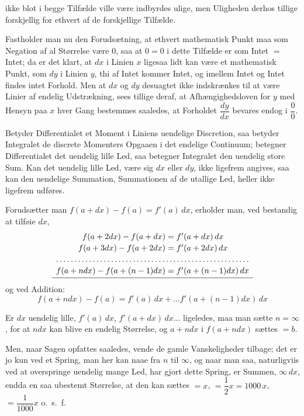 \documentclass[12pt]{book}
\newcommand{\opage}[1]{\marginnote{\footnotesize\textit{[#1]}}}
\begin{document}
ikke blot i begge Tilfælde ville være indbyrdes ulige, men
\opage{69} Uligheden derhos tillige forskjellig for ethvert af de forskjellige Tilfælde.

Fastholder man nu den Forudsætning, at ethvert mathematisk Punkt maa som Negation af
al Størrelse være 0, saa at $0 = 0$ i dette Tilfælde er som Intet $=$ Intet; da er
det klart, at $dx$ i Linien $x$ ligesaa lidt kan være et mathematisk Punkt, som $dy$
i Linien $y$, thi af Intet kommer Intet, og imellem Intet og Intet findes intet
Forhold. Men at $dx$ og $dy$ desuagtet ikke indskrænkes til at være Linier af
endelig Udstrækning, sees tillige deraf, at Afhængighedsloven for $y$ med Hensyn paa
$x$ hver Gang bestemmes saaledes, at Forholdet $\dfrac{dy}{dx}$ bevares endog i
$\dfrac{0}{0}$.

Betyder Differentialet et Moment i Liniens uendelige Discretion, saa betyder
Integralet de discrete Momenters Opgaaen i det endelige Continuum; betegner
Differentialet det uendelig lille Led, saa betegner Integralet den uendelig store
Sum. Kan det uendelig lille Led, være sig $dx$ eller $dy$, ikke ligefrem angives,
saa kan den uendelige Summation, Summationen af de utallige Led, heller ikke
ligefrem udføres.

Forudsætter man $f(a + dx) - f(a) = f'(a)\,dx$, erholder man, ved bestandig at
tilføie $dx$,
\[
\begin{array}{r@{\;=\;}l}
f(a+2dx) - f(a+dx) & f'(a+dx)\,dx\\[2pt]
f(a+3dx) - f(a+2dx) & f'(a+2dx)\,dx\\[2pt]
\hdotsfor{2}\\[2pt]
f(a+ndx) - f(a+(n-1)dx) & f'(a+(n-1)dx)\,dx\\[2pt]
\hline
\end{array}
\]
og ved Addition:
\[
f(a+ndx) - f(a) = f'(a)\,dx + \dots f'(a+(n-1)dx)\,dx
\]

Er $dx$ uendelig lille, $f'(a)\,dx$, $f'(a+dx)\,dx \dots$ ligeledes, maa man sætte
$n = \infty$, for at $ndx$ kan blive en endelig Størrelse, og $a + ndx$ i
$f(a + ndx)$ sættes $= b$.

Men, naar Sagen opfattes saaledes, vende de gamle Vanskeligheder tilbage; det er jo
kun ved et Spring, man her kan naae fra $n$ til $\infty$, og naar man saa,
naturligviis ved at overspringe uendelig mange Led, har gjort dette Spring,
\opage{70} er Summen, $\infty\, dx$, endda en saa ubestemt Størrelse, at den kan sættes
$= x$, $= \dfrac{1}{2}x = 1000\,x$, $= \dfrac{1}{1000}x$ o.\ s.\ f.
\end{document}
